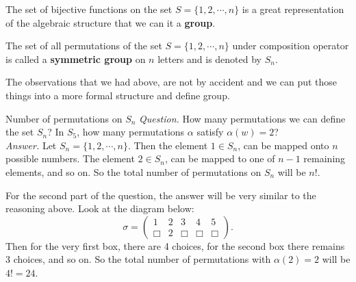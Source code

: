 The set of bijective functions on the set $S = \{ 1,2,\cdots,n\}$ is a great representation of the algebraic structure that we can it a \textbf{group}.

\begin{defbox}
	The set of all permutations of the set $S = \{1,2,\cdots,n\}$ under composition operator is called a  \textbf{symmetric group} on $n$ letters and is denoted by $S_n$.
\end{defbox}

The observations that we had above, are not by accident and we can put those things into a more formal structure and define group.

\begin{example}{Number of permutations on $S_n$}
	\textit{Question.} How many permutations we can define the set $S_n$? In $S_5$, how many permutations $\alpha$ satisfy $\alpha(w) = 2$? \\
	
	\textit{Answer.} Let $S_n = \{ 1,2,\cdots,n \}$. Then the element $1 \in S_n$, can be mapped onto $n$ possible numbers. The element $2 \in S_n$, can be mapped to one of $n-1$ remaining elements, and so on. So the total number of permutations on $S_n$ will be $n!$.
	
	For the second part of the question, the answer will be very similar to the reasoning above. Look at the diagram below:
	\[ \sigma = \begin{pmatrix} 1 & 2 & 3 & 4 & 5 \\ \Box & 2 & \Box & \Box & \Box \end{pmatrix}. \]
	Then for the very first box, there are 4 choices, for the second box there remains 3 choices, and so on. So the total number of permutations with $\alpha(2) =2$ will be $4! = 24$.
\end{example}

